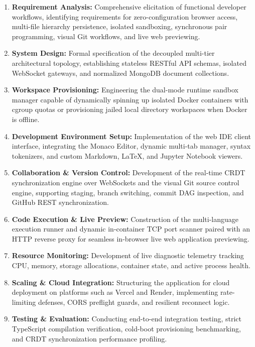 \documentclass[conference]{IEEEtran}
\begin{document}
\begin{enumerate}
    \item \textbf{Requirement Analysis:} Comprehensive elicitation of functional developer workflows, identifying requirements for zero-configuration browser access, multi-file hierarchy persistence, isolated sandboxing, synchronous pair programming, visual Git workflows, and live web previewing.
    \item \textbf{System Design:} Formal specification of the decoupled multi-tier architectural topology, establishing stateless RESTful API schemas, isolated WebSocket gateways, and normalized MongoDB document collections.
    \item \textbf{Workspace Provisioning:} Engineering the dual-mode runtime sandbox manager capable of dynamically spinning up isolated Docker containers with cgroup quotas or provisioning jailed local directory workspaces when Docker is offline.
    \item \textbf{Development Environment Setup:} Implementation of the web IDE client interface, integrating the Monaco Editor, dynamic multi-tab manager, syntax tokenizers, and custom Markdown, LaTeX, and Jupyter Notebook viewers.
    \item \textbf{Collaboration \& Version Control:} Development of the real-time CRDT synchronization engine over WebSockets and the visual Git source control engine, supporting staging, branch switching, commit DAG inspection, and GitHub REST synchronization.
    \item \textbf{Code Execution \& Live Preview:} Construction of the multi-language execution runner and dynamic in-container TCP port scanner paired with an HTTP reverse proxy for seamless in-browser live web application previewing.
    \item \textbf{Resource Monitoring:} Development of live diagnostic telemetry tracking CPU, memory, storage allocations, container state, and active process health.
    \item \textbf{Scaling \& Cloud Integration:} Structuring the application for cloud deployment on platforms such as Vercel and Render, implementing rate-limiting defenses, CORS preflight guards, and resilient reconnect logic.
    \item \textbf{Testing \& Evaluation:} Conducting end-to-end integration testing, strict TypeScript compilation verification, cold-boot provisioning benchmarking, and CRDT synchronization performance profiling.
\end{enumerate}
\end{document}
